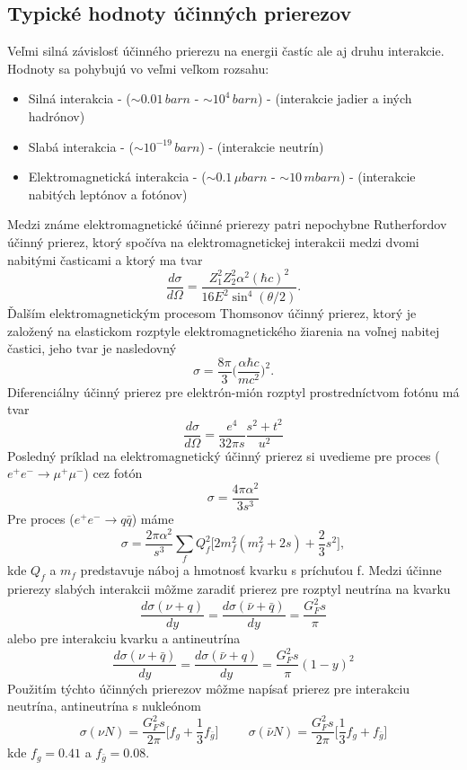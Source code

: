 \documentclass[../../main.tex]{subfiles}
\begin{document}
\subsection{Typické hodnoty účinných prierezov}
Veľmi silná závislosť účinného prierezu na energii častíc ale aj druhu interakcie. Hodnoty sa pohybujú vo veľmi veľkom rozsahu:
\begin{itemize}
\item Silná interakcia - ($\sim 0.01\,barn$ - $\sim 10^4\,barn$) - (interakcie jadier a iných hadrónov)
\item Slabá interakcia - ($\sim 10^{-19}\,barn$) - (interakcie neutrín)
\item Elektromagnetická interakcia - ($\sim 0.1\,\mu barn$ - $\sim 10\,mbarn$) - (interakcie nabitých leptónov a fotónov)
\end{itemize} 


Medzi známe elektromagnetické účinné prierezy patri nepochybne Rutherfordov účinný prierez, ktorý spočíva na elektromagnetickej interakcii medzi dvomi nabitými časticami a ktorý ma tvar
$$ \frac{d\sigma}{d\Omega} = \frac{Z_1^2Z_2^2\alpha^2(\hbar c)^2}{16E^2\sin^4(\theta/2)}.$$
Ďalším elektromagnetickým procesom Thomsonov účinný prierez, ktorý je založený na elastickom rozptyle elektromagnetického žiarenia na voľnej nabitej častici, jeho tvar je nasledovný
$$ \sigma = \frac{8\pi}{3} \bigg(\frac{\alpha \hbar c}{mc^2} \bigg)^2.$$ 
Diferenciálny účinný prierez pre elektrón-mión rozptyl prostredníctvom fotónu má tvar
$$ \frac{d\sigma}{d\Omega} = \frac{e^4}{32\pi s}\frac{s^2+t^2}{u^2} $$
Posledný príklad na elektromagnetický účinný prierez si uvedieme pre proces ($e^+e^- \rightarrow \mu^+ \mu^-$) cez fotón
$$ \sigma = \frac{4 \pi \alpha^2}{3s^3} $$
Pre proces ($ e^+e^- \rightarrow q \bar{q} $) máme 
$$ \sigma = \frac{2\pi \alpha^2}{s^3} \sum_f Q^2_f \bigg[ 2m_f^2(m^2_f+2s)+\frac{2}{3}s^2 \bigg], $$
kde $Q_f$ a $m_f$ predstavuje náboj a hmotnosť kvarku s príchuťou f.
Medzi účinne prierezy slabých interakcii môžme zaradiť prierez pre rozptyl neutrína na kvarku
$$ \frac{d\sigma(\nu+q)}{dy} = \frac{d\sigma(\bar{\nu}+\bar{q})}{dy} = \frac{G_F^2s}{\pi} $$
alebo pre interakciu kvarku a antineutrína
$$ \frac{d\sigma(\nu+\bar{q})}{dy} = \frac{d\sigma(\bar{\nu}+q)}{dy} = \frac{G_F^2s}{\pi}(1-y)^2 $$
Použitím týchto účinných prierezov môžme napísať prierez pre interakciu neutrína, antineutrína s nukleónom
$$\sigma(\nu N )=\frac{G_F^2s}{2\pi} \bigg[f_g+\frac{1}{3}f_{\bar{g}} \bigg] \hspace{1cm} \sigma(\bar{\nu} N )=\frac{G_F^2s}{2\pi} \bigg[\frac{1}{3}f_g+f_{\bar{g}} \bigg] $$
kde $f_g=0.41$ a $f_{\bar{g}}=0.08$.
\end{document}
